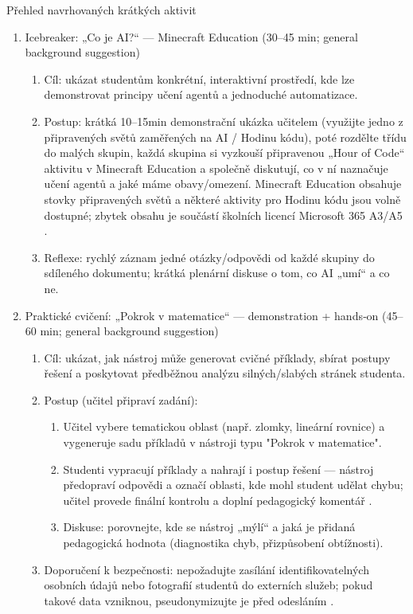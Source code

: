 \documentclass{report}%
\begin{document}
Přehled navrhovaných krátkých aktivit
\begin{enumerate}
  \item Icebreaker: „Co je AI?“ — Minecraft Education (30–45 min; general background suggestion)
    \begin{enumerate}
      \item Cíl: ukázat studentům konkrétní, interaktivní prostředí, kde lze demonstrovat principy učení agentů a jednoduché automatizace.
      \item Postup: krátká 10–15min demonstrační ukázka učitelem (využijte jedno z připravených světů zaměřených na AI / Hodinu kódu), poté rozdělte třídu do malých skupin, každá skupina si vyzkouší připravenou „Hour of Code“ aktivitu v Minecraft Education a společně diskutují, co v ní naznačuje učení agentů a jaké máme obavy/omezení. Minecraft Education obsahuje stovky připravených světů a některé aktivity pro Hodinu kódu jsou volně dostupné; zbytek obsahu je součástí školních licencí Microsoft 365 A3/A5 \cite{kb_ai_101_tipu_pdf_04e4a115_page_15_2}.
      \item Reflexe: rychlý záznam jedné otázky/odpovědi od každé skupiny do sdíleného dokumentu; krátká plenární diskuse o tom, co AI „umí“ a co ne.
    \end{enumerate}

  \item Praktické cvičení: „Pokrok v matematice“ — demonstration + hands‑on (45–60 min; general background suggestion)
    \begin{enumerate}
      \item Cíl: ukázat, jak nástroj může generovat cvičné příklady, sbírat postupy řešení a poskytovat předběžnou analýzu silných/slabých stránek studenta.
      \item Postup (učitel připraví zadání):
        \begin{enumerate}
          \item Učitel vybere tematickou oblast (např. zlomky, lineární rovnice) a vygeneruje sadu příkladů v nástroji typu "Pokrok v matematice".
          \item Studenti vypracují příklady a nahrají i postup řešení — nástroj předopraví odpovědi a označí oblasti, kde mohl student udělat chybu; učitel provede finální kontrolu a doplní pedagogický komentář \cite{kb_ai_101_tipu_pdf_04e4a115_page_8_1}.
          \item Diskuse: porovnejte, kde se nástroj „mýlí“ a jaká je přidaná pedagogická hodnota (diagnostika chyb, přizpůsobení obtížnosti).
        \end{enumerate}
      \item Doporučení k bezpečnosti: nepožadujte zasílání identifikovatelných osobních údajů nebo fotografií studentů do externích služeb; pokud takové data vzniknou, pseudonymizujte je před odesláním \cite{kb_malinka_chatgpt_ve_vyuce_dva_roky_pote_2024_pdf_90bc3aaf_page_12_1}.
    \end{enumerate}


\end{enumerate}
\end{document}

